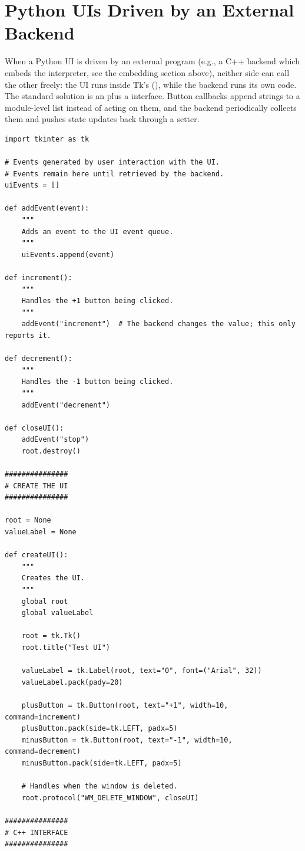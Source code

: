 \section{Python UIs Driven by an External Backend}

When a Python  UI is driven by an external program (e.g., a C++ backend which embeds the interpreter, see the embedding section above), neither side can call the other freely: the UI runs inside Tk's (), while the backend runs its own code. The standard solution is an  plus a  interface. Button callbacks append  strings to a module-level list instead of acting on them, and the backend periodically collects them and pushes state updates back through a setter.

\begin{lstlisting}
import tkinter as tk

# Events generated by user interaction with the UI.
# Events remain here until retrieved by the backend.
uiEvents = []

def addEvent(event):
    """
    Adds an event to the UI event queue.
    """
    uiEvents.append(event)

def increment():
    """
    Handles the +1 button being clicked.
    """
    addEvent("increment")  # The backend changes the value; this only reports it.

def decrement():
    """
    Handles the -1 button being clicked.
    """
    addEvent("decrement")

def closeUI():
    addEvent("stop")
    root.destroy()

###############
# CREATE THE UI
###############

root = None
valueLabel = None

def createUI():
    """
    Creates the UI.
    """
    global root
    global valueLabel

    root = tk.Tk()
    root.title("Test UI")

    valueLabel = tk.Label(root, text="0", font=("Arial", 32))
    valueLabel.pack(pady=20)

    plusButton = tk.Button(root, text="+1", width=10, command=increment)
    plusButton.pack(side=tk.LEFT, padx=5)
    minusButton = tk.Button(root, text="-1", width=10, command=decrement)
    minusButton.pack(side=tk.LEFT, padx=5)

    # Handles when the window is deleted.
    root.protocol("WM_DELETE_WINDOW", closeUI)

###############
# C++ INTERFACE
###############


\end{lstlisting}
